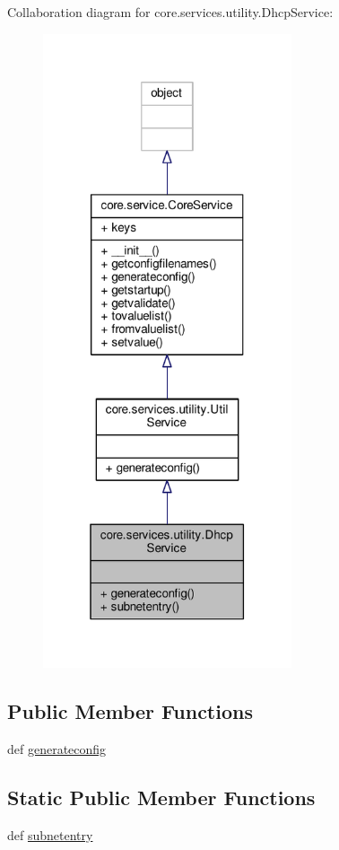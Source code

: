 Collaboration diagram for core.\+services.\+utility.\+Dhcp\+Service\+:
\nopagebreak
\begin{figure}[H]
\begin{center}
\leavevmode
\includegraphics[width=208pt]{classcore_1_1services_1_1utility_1_1_dhcp_service__coll__graph}
\end{center}
\end{figure}
\subsection*{Public Member Functions}
\begin{DoxyCompactItemize}
\item 
def \hyperlink{classcore_1_1services_1_1utility_1_1_dhcp_service_a3f243d8bf19ca34c2d886dd100ccff28}{generateconfig}
\end{DoxyCompactItemize}
\subsection*{Static Public Member Functions}
\begin{DoxyCompactItemize}
\item 
def \hyperlink{classcore_1_1services_1_1utility_1_1_dhcp_service_abd5ca71790f6b583d5067f26469a0524}{subnetentry}
\end{DoxyCompactItemize}
